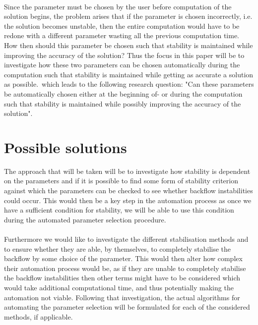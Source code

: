 \\
Since the parameter must be chosen by the user before computation of the solution begins, the problem arises that if the parameter is chosen incorrectly, i.e. the solution becomes unstable, then the entire computation would have to be redone with a different parameter wasting all the previous computation time. How then should this parameter be chosen such that stability is maintained while improving the accuracy of the solution? Thus the focus in this paper will be to investigate how these two parameters can be chosen automatically during the computation such that stability is maintained while getting as accurate a solution as possible.\, which leads to the following research question: "Can these parameters be automatically chosen either at the beginning of- or during the computation such that stability is maintained while possibly improving the accuracy of the solution".

\section{Possible solutions}

The approach that will be taken will be to investigate how stability is dependent on the parameters and if it is possible to find some form of stability criterion against which the parameters can be checked to see whether backflow instabilities could occur. This would then be a key step in the automation process as once we have a sufficient condition for stability, we will be able to use this condition during the automated parameter selection procedure.\\
\\
Furthermore we would like to investigate the different stabilisation methods and to ensure whether they are able, by themselves, to completely stabilise the backflow by some choice of the parameter. This would then alter how complex their automation process would be, as if they are unable to completely stabilise the backflow instabilities then other terms might have to be considered which would take additional computational time, and thus potentially making the automation not viable. Following that investigation, the actual algorithms for automating the parameter selection will be formulated for each of the considered methods, if applicable.